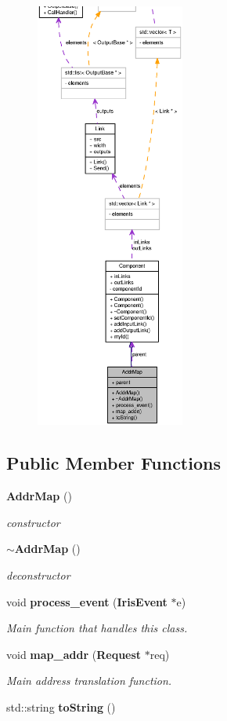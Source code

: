 \begin{figure}[H]
\begin{center}
\leavevmode
\includegraphics[height=400pt]{classAddrMap__coll__graph}
\end{center}
\end{figure}
\subsection*{Public Member Functions}
\begin{CompactItemize}
\item 
{\bf AddrMap} ()
\begin{CompactList}\small\item\em constructor \item\end{CompactList}\item 
{\bf $\sim$AddrMap} ()
\begin{CompactList}\small\item\em deconstructor \item\end{CompactList}\item 
void {\bf process\_\-event} ({\bf IrisEvent} $\ast$e)
\begin{CompactList}\small\item\em Main function that handles this class. \item\end{CompactList}\item 
void {\bf map\_\-addr} ({\bf Request} $\ast$req)
\begin{CompactList}\small\item\em Main address translation function. \item\end{CompactList}\item 
std::string {\bf toString} ()
\end{CompactItemize}
